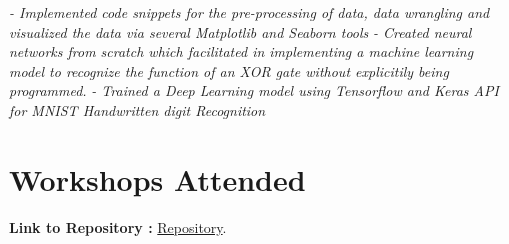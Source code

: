 \documentclass[a4paper,12pt]{article}
\begin{document}
\begin{itemize}
{              \newline
              \textit{- Implemented code snippets for the pre-processing of data, data wrangling and visualized the data via several Matplotlib and Seaborn tools }
              \newline
              \textit{- Created neural networks from scratch which facilitated in implementing a machine learning model to recognize the function of an XOR gate without explicitily being programmed.}
              \newline
              \textit{- Trained a Deep Learning model using Tensorflow and Keras API for MNIST Handwritten digit Recognition}}

\end{itemize}

\section*{Workshops Attended}
\textbf{Link to Repository :} \href{https://github.com/teetangh/Attended-Workshops}{Repository}.
\end{document}
